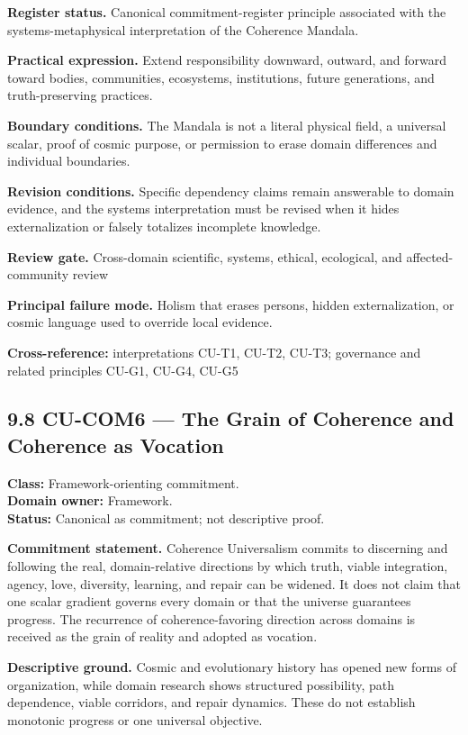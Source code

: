 \documentclass[
  11pt,
]{article}
\begin{document}
\textbf{Register status.} Canonical commitment-register principle
associated with the systems-metaphysical interpretation of the Coherence
Mandala.

\textbf{Practical expression.} Extend responsibility downward, outward,
and forward toward bodies, communities, ecosystems, institutions, future
generations, and truth-preserving practices.

\textbf{Boundary conditions.} The Mandala is not a literal physical
field, a universal scalar, proof of cosmic purpose, or permission to
erase domain differences and individual boundaries.

\textbf{Revision conditions.} Specific dependency claims remain
answerable to domain evidence, and the systems interpretation must be
revised when it hides externalization or falsely totalizes incomplete
knowledge.

\textbf{Review gate.} Cross-domain scientific, systems, ethical,
ecological, and affected-community review

\textbf{Principal failure mode.} Holism that erases persons, hidden
externalization, or cosmic language used to override local evidence.

\textbf{Cross-reference:} interpretations CU-T1, CU-T2, CU-T3;
governance and related principles CU-G1, CU-G4, CU-G5

\subsection{9.8 CU-COM6 --- The Grain of Coherence and Coherence as
Vocation}\label{cu-com6-the-grain-of-coherence-and-coherence-as-vocation}

\textbf{Class:} Framework-orienting commitment.\\
\textbf{Domain owner:} Framework.\\
\textbf{Status:} Canonical as commitment; not descriptive proof.

\textbf{Commitment statement.} Coherence Universalism commits to
discerning and following the real, domain-relative directions by which
truth, viable integration, agency, love, diversity, learning, and repair
can be widened. It does not claim that one scalar gradient governs every
domain or that the universe guarantees progress. The recurrence of
coherence-favoring direction across domains is received as the grain of
reality and adopted as vocation.

\textbf{Descriptive ground.} Cosmic and evolutionary history has opened
new forms of organization, while domain research shows structured
possibility, path dependence, viable corridors, and repair dynamics.
These do not establish monotonic progress or one universal objective.
\end{document}
